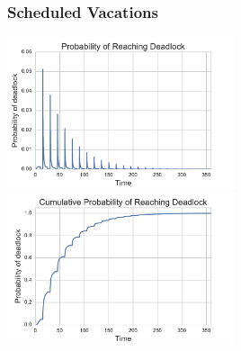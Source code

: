 \documentclass[xcolor={table}]{beamer}
\begin{document}
\begin{frame}
\frametitle{Scheduled Vacations}

\end{frame}

\begin{frame}
\includegraphics[width=0.5\textwidth]{../images/pdf_initial.pdf}
\includegraphics[width=0.5\textwidth]{../images/cdf_initial.pdf}
\end{frame}

\begin{frame}
\begin{center}

\end{center}
\end{frame}

\begin{frame}
\begin{center}

\end{center}
\end{frame}
\end{document}
